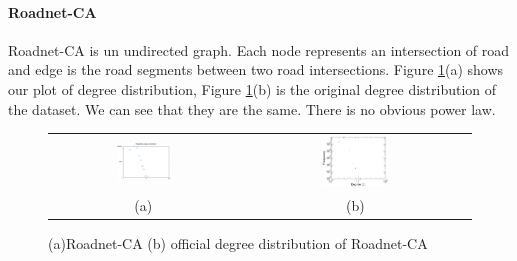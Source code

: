 \paragraph{Roadnet-CA}
Roadnet-CA is un undirected graph. Each node represents an intersection of road and edge is the road segments between two road intersections. Figure \ref{t1:ca}(a) shows our plot of degree distribution, Figure \ref{t1:ca}(b) is the original degree distribution of the dataset. We can see that they are the same. There is no obvious power law.
\begin{figure}[!htbf]
\begin{center}
\begin{tabular}{c c}
     \includegraphics[width=0.3\textwidth]{FIG/t1_ca.png} & 
     \includegraphics[width=0.3\textwidth]{FIG/t1_ca_truth.png}\\
    (a) & (b)\\
\end{tabular}
\caption{(a)Roadnet-CA (b) official degree distribution of Roadnet-CA}
\label{t1:ca}
\end{center}
\end{figure}


